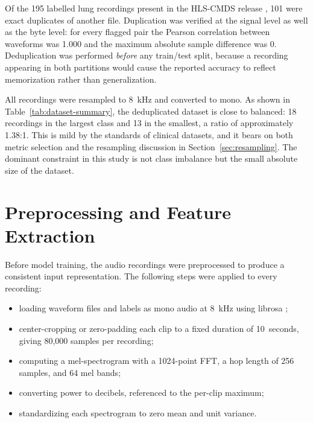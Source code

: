 \documentclass[conference]{IEEEtran}
\begin{document}
Of the 195 labelled lung recordings present in the HLS-CMDS release \cite{b5},
101 were exact duplicates of another file. Duplication was verified at the signal level as well as the byte
level: for every flagged pair the Pearson correlation between waveforms was 1.000
and the maximum absolute sample difference was 0. Deduplication was performed
\emph{before} any train/test split, because a recording appearing in both
partitions would cause the reported accuracy to reflect memorization rather than
generalization.

All recordings were resampled to 8~kHz and converted to mono. As shown in
Table~\ref{tab:dataset-summary}, the deduplicated dataset is close to balanced:
18 recordings in the largest class and 13 in the smallest, a ratio of
approximately 1.38:1. This is mild by the standards of clinical datasets, and it
bears on both metric selection and the resampling discussion in
Section~\ref{sec:resampling}. The dominant constraint in this study is not class
imbalance but the small absolute size of the dataset.

\section{Preprocessing and Feature Extraction}
Before model training, the audio recordings were preprocessed to produce a
consistent input representation. The following steps were applied to every
recording:

\begin{itemize}
    \item loading waveform files and labels as mono audio at 8~kHz using
    librosa \cite{b2};
    \item center-cropping or zero-padding each clip to a fixed duration of
    10~seconds, giving 80{,}000 samples per recording;
    \item computing a mel-spectrogram with a 1024-point FFT, a hop length of
    256 samples, and 64 mel bands;
    \item converting power to decibels, referenced to the per-clip maximum;
    \item standardizing each spectrogram to zero mean and unit variance.
\end{itemize}
\end{document}
